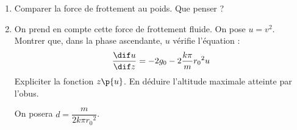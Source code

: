 \documentclass[a4paper,french,bookmarks]{article}
\begin{document}
\begin{enumerate}
\begin{enumerate}
\begin{enumerate}
                \item Comparer la force de frottement au poids. Que penser ?
                
                
                \item On prend en compte cette force de frottement fluide. On
                pose $u=v^2$. Montrer que, dans la phase ascendante, $u$
                vérifie l'équation :
                \[
                    \dfrac{\dif u}{\dif z} = -2g_0 -2\dfrac{k\pi}{m}{r_0}^2u
                \]
                Expliciter la fonction $z\p{u}$. En déduire l'altitude
                maximale atteinte par l'obus.
                
                On posera $d = \dfrac{m}{2k\pi{r_0}^2}$.
                

\end{enumerate}
\end{enumerate}
\end{enumerate}
\end{document}

